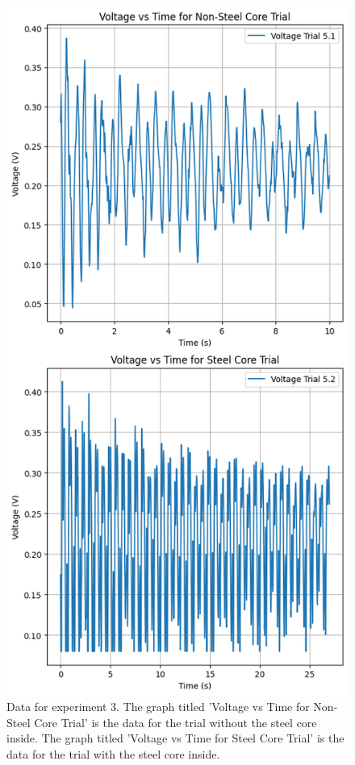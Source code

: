 \documentclass[11pt]{article}
\begin{document}
    \begin{figure}[H]
        \centering
        \includegraphics[width=0.8\linewidth]{resources/images/part3 graphs}
        \caption{Data for experiment 3. The graph titled 'Voltage vs Time for Non-Steel Core Trial' is the data for the trial without the steel core inside. The graph titled 'Voltage vs Time for Steel Core Trial' is the data for the trial with the steel core inside.}
        \label{fig:part3_graphs}
    \end{figure}
\end{document}
